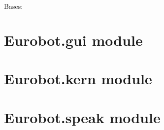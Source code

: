 \documentclass[letterpaper,10pt,english]{sphinxmanual}
\begin{document}

\begin{fulllineitems}
\label{Eurobot:Eurobot.ethernet.Server}
Bases: 

\begin{fulllineitems}
\label{Eurobot:Eurobot.ethernet.Server.connection}
\end{fulllineitems}


\begin{fulllineitems}
\label{Eurobot:Eurobot.ethernet.Server.wait_connections}
\end{fulllineitems}


\end{fulllineitems}



\section{Eurobot.gui module}
\label{Eurobot:module-Eurobot.gui}\label{Eurobot:eurobot-gui-module}

\section{Eurobot.kern module}
\label{Eurobot:module-Eurobot.kern}\label{Eurobot:eurobot-kern-module}

\begin{fulllineitems}
\label{Eurobot:Eurobot.kern.main}
\end{fulllineitems}



\section{Eurobot.speak module}
\label{Eurobot:eurobot-speak-module}\label{Eurobot:module-Eurobot.speak}
\end{document}
